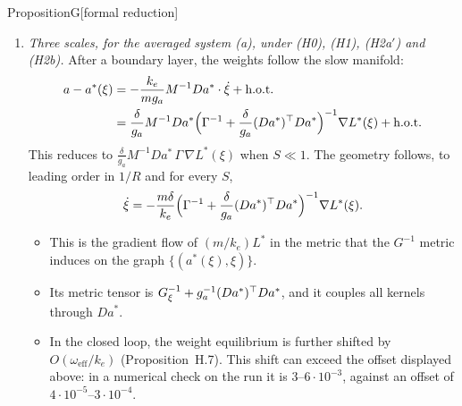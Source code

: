 \begin{thm}{Proposition}{G}[formal reduction]
\begin{enumerate}[label=(\alph*),leftmargin=2.2em]
  \item[\textup{(b$'$)}] \emph{Three scales, for the averaged system \textup{(a)}, under \textup{(H0)}, \textup{(H1)},
    \textup{(H2a$'$)} and \textup{(H2b)}.} After a boundary layer, the weights follow the slow manifold:
    \begin{equation}\label{eq:propG:offset}
      \begin{aligned}
        a - a^*(\xi) &= -\frac{k_e}{m g_a}M^{-1}Da^*\cdot\dot\xi + \textup{h.o.t.}\\
        &= \frac{\delta}{g_a}M^{-1}Da^*\Bigl(\Gamma^{-1} + \frac{\delta}{g_a}(Da^*)^\top Da^*\Bigr)^{-1}
        \nabla L^*(\xi) + \textup{h.o.t.}
      \end{aligned}
    \end{equation}
    This reduces to $\frac{\delta}{g_a}M^{-1}Da^*\,\Gamma\,\nabla L^*(\xi)$ when $S \ll 1$. The geometry follows, to
    leading order in $1/R$ and for every $S$,
    \begin{equation}\label{eq:propG:induced}
      \dot\xi = -\frac{m\delta}{k_e}\Bigl(\Gamma^{-1} + \frac{\delta}{g_a}(Da^*)^\top Da^*\Bigr)^{-1}\nabla L^*(\xi).
    \end{equation}
    \begin{itemize}
      \item This is the gradient flow of $(m/k_e)L^*$ in the metric that the $G^{-1}$ metric induces on the graph
        $\{(a^*(\xi),\xi)\}$.
      \item Its metric tensor is $G_\xi^{-1} + g_a^{-1}(Da^*)^\top Da^*$, and it couples all kernels through $Da^*$.
      \item In the closed loop, the weight equilibrium is further shifted by $O(\omega_{\mathrm{eff}}/k_e)$
        (Proposition~H.7). This shift can exceed the offset displayed above: in a numerical check on the
         run it is $3$--$6\cdot10^{-3}$, against an offset of $4\cdot10^{-5}$--$3\cdot10^{-4}$.
    \end{itemize}


\end{enumerate}
\end{thm}
